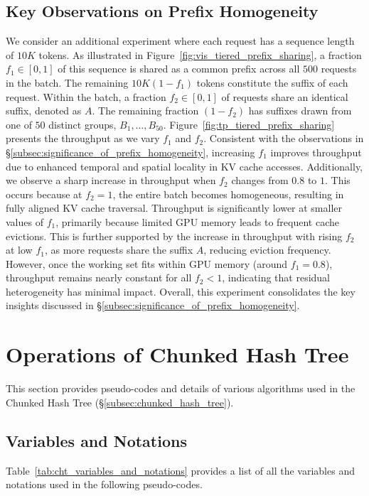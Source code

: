 \subsection{Key Observations on Prefix Homogeneity}
\label{subsec:tiered_prefix_sharing}
We consider an additional experiment where each request has a sequence length of $10K$ tokens. As illustrated in Figure~\ref{fig:vis_tiered_prefix_sharing}, a fraction $f_1 \in [0, 1]$ of this sequence is shared as a common prefix across all $500$ requests in the batch. The remaining $10K(1 - f_1)$ tokens constitute the suffix of each request. Within the batch, a fraction $f_2 \in [0, 1]$ of requests share an identical suffix, denoted as $A$. The remaining fraction $(1 - f_2)$ has suffixes drawn from one of $50$ distinct groups, $B_1, \dots, B_{50}$. Figure~\ref{fig:tp_tiered_prefix_sharing} presents the throughput as we vary $f_1$ and $f_2$. Consistent with the observations in \S\ref{subsec:significance_of_prefix_homogeneity}, increasing $f_1$ improves throughput due to enhanced temporal and spatial locality in KV cache accesses. Additionally, we observe a sharp increase in throughput when $f_2$ changes from $0.8$ to $1$. This occurs because at $f_2 = 1$, the entire batch becomes homogeneous, resulting in fully aligned KV cache traversal. Throughput is significantly lower at smaller values of $f_1$, primarily because limited GPU memory leads to frequent cache evictions. This is further supported by the increase in throughput with rising $f_2$ at low $f_1$, as more requests share the suffix $A$, reducing eviction frequency. However, once the working set fits within GPU memory (around $f_1 = 0.8$), throughput remains nearly constant for all $f_2 < 1$, indicating that residual heterogeneity has minimal impact. Overall, this experiment consolidates the key insights discussed in \S\ref{subsec:significance_of_prefix_homogeneity}.

\section{Operations of Chunked Hash Tree}
\label{sec:algorithms}
This section provides pseudo-codes and details of various algorithms used in the Chunked Hash Tree (\S\ref{subsec:chunked_hash_tree}).

\subsection{Variables and Notations}
Table~\ref{tab:cht_variables_and_notations} provides a list of all the variables and notations used in the following pseudo-codes.


